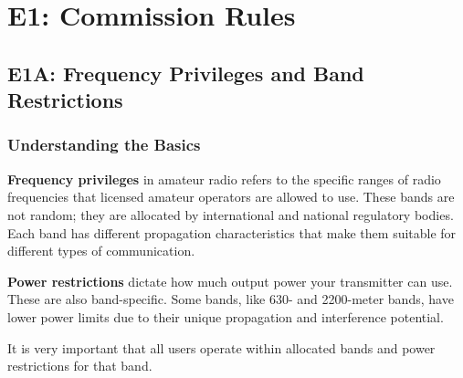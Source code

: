 \chapter{E1: Commission Rules}

\section{E1A: Frequency Privileges and Band Restrictions}

\subsection*{Understanding the Basics}
  \textcolor{myblue}{\textbf{Frequency privileges}} in amateur radio refers to the specific ranges of radio frequencies that licensed amateur operators are allowed to use. These bands are not random; they are allocated by international and national regulatory bodies. Each band has different propagation characteristics that make them suitable for different types of communication.
  \par
  \textcolor{myblue}{\textbf{Power restrictions}} dictate how much output power your transmitter can use. These are also band-specific. Some bands, like 630- and 2200-meter bands, have lower power limits due to their unique propagation and interference potential.
  \par
  It is very important that all users operate within allocated bands and power restrictions for that band.
  
  
